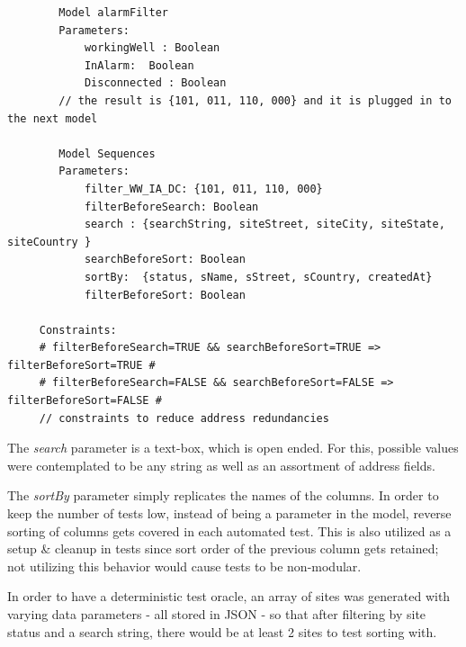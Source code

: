 \documentclass[conference]{IEEEtran}
\begin{document}
	\begin{lstlisting}
		Model alarmFilter
	 	Parameters:
			workingWell : Boolean
			InAlarm:  Boolean
			Disconnected : Boolean
		// the result is {101, 011, 110, 000} and it is plugged in to the next model 	

		Model Sequences
		Parameters:
			filter_WW_IA_DC: {101, 011, 110, 000}
			filterBeforeSearch: Boolean
			search : {searchString, siteStreet, siteCity, siteState, siteCountry }
			searchBeforeSort: Boolean
			sortBy:  {status, sName, sStreet, sCountry, createdAt}
			filterBeforeSort: Boolean
	 
	 Constraints:
	 # filterBeforeSearch=TRUE && searchBeforeSort=TRUE => filterBeforeSort=TRUE #
	 # filterBeforeSearch=FALSE && searchBeforeSort=FALSE => filterBeforeSort=FALSE #
	 // constraints to reduce address redundancies
	\end{lstlisting}


	The \textit{search} parameter is a text-box, which is open ended. For this, possible values were contemplated to be any string as well as an assortment of address fields.

	The \textit{sortBy} parameter simply replicates the names of the columns. 
	In order to keep the number of tests low, instead of being a parameter in the model, reverse sorting of columns gets covered in each automated test.
	This is also utilized as a setup \& cleanup in tests since sort order of the previous column gets retained; not utilizing this behavior  would cause tests to be non-modular.

	In order to have a deterministic test oracle, an array of sites was generated with varying data parameters - all stored in JSON - so that after filtering by site status and a search string, there would be at least 2 sites to test sorting with.
	
\end{document}
